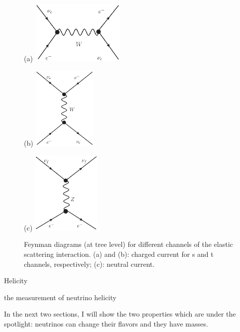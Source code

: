 \begin{figure}[htbp]
	\centering
	\begin{minipage}[t]{0.45\textwidth}{(a)}
		\centering
		\includegraphics[width=4.5cm]{charged-1.eps}
	\end{minipage}
	\begin{minipage}[t]{0.3\textwidth}{(b)}
		\centering
		\includegraphics[height=4cm]{charged.eps}
	\end{minipage}
	\begin{minipage}[t]{0.4\textwidth}{(c)}
		\centering
		\includegraphics[height=4cm]{neutral.eps}
	\end{minipage}
	\caption{Feynman diagrams (at tree level) for different channels of the elastic scattering interaction. (a) and (b): charged current for s and t channels, respectively; (c): neutral current.}
	\label{feynman-es}
\end{figure}


Helicity

the measurement of neutrino helicity\cite{goldhaber1958helicity} 



In the next two sections, I will show the two properties which are under the spotlight: neutrinos can change their flavors and they have masses.

